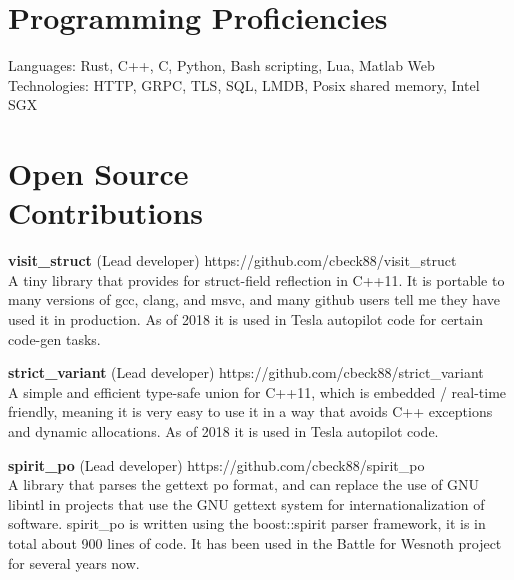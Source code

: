 \documentclass[margin,line]{resume}
\begin{document}
\begin{resume}

       


    \section{\mysidestyle Programming Proficiencies} 

    Languages: Rust, C++, C, Python, Bash scripting, Lua, Matlab
    Web Technologies: HTTP, GRPC, TLS, SQL, LMDB, Posix shared memory, Intel SGX

    \section{\mysidestyle Open Source\\Contributions}

    \textbf{visit\_struct} (Lead developer) \hfill https://github.com/cbeck88/visit\_struct \\
    A tiny library that provides for struct-field reflection in C++11. It is portable to many versions of gcc, clang, and msvc,
    and many github users tell me they have used it in production. As of 2018 it is used in Tesla autopilot code for certain code-gen tasks.

    \textbf{strict\_variant} (Lead developer) \hfill https://github.com/cbeck88/strict\_variant \\
    A simple and efficient type-safe union for C++11, which is embedded / real-time friendly, meaning it is very easy
    to use it in a way that avoids C++ exceptions and dynamic allocations. As of 2018 it is used in Tesla autopilot code.

    \textbf{spirit\_po} (Lead developer) \hfill https://github.com/cbeck88/spirit\_po \\
    A library that parses the gettext po format, and can replace the use of GNU libintl in projects that use the GNU
    gettext system for internationalization of software.
    spirit\_po is written using the boost::spirit parser framework, it is in total about 900 lines of code.
    It has been used in the Battle for Wesnoth project for several years now.


\end{resume}
\end{document}

